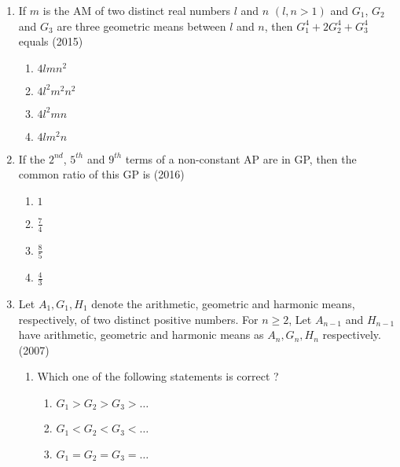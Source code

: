 \begin{enumerate}[label=\thesubsection.\arabic*,ref=\thesubsection.\theenumi]
	{\hfill{}} 
\begin{enumerate}
\end{enumerate}
    \item If $m$ is the AM of two distinct real numbers $l$ and $n$ $(l, n>1)$ and $G_1$,  $G_2$ and $G_3$ are three geometric means between $l$ and $n$,  then $G_1^4+2G_2^4+G_3^4$ equals 
%    
    \hfill(2015)
    \begin{multicols}{4}
\begin{enumerate}    
    \item$4lmn^2$
    \item$4l^2m^2n^2$
    \item$4l^2mn$
    \item$4lm^2n$ 
    \end{enumerate}
\end{multicols}
%
    \item If the $2^{nd}$,  $5^{th}$ and $9^{th}$ terms of a non-constant AP are in GP,  then the common ratio of this GP is
    \hfill(2016)
    \begin{multicols}{4}
\begin{enumerate}    
    \item $1$
    \item $\frac{7}{4}$
    \item $\frac{8}{5}$
    \item $\frac{4}{3}$
    \end{enumerate}
\end{multicols}
%    
\item[]  
%
Let $A_{1},  G_{1},  H_{1} $ denote the arithmetic,  geometric and harmonic means,  respectively,  of two distinct positive numbers. For $n\geq 2$,  Let $A_{n-1}$ and $H_{n-1}$ have arithmetic,  geometric and harmonic means as $A_{n}, G_{n}, H_{n}$ respectively. \hfill(2007)
\begin{enumerate}    
%      
%  
 \item Which one of the following statements is correct ?
\begin{enumerate}    
%
% 
	\item$G_{1}>G_{2}>G_{3}>\dots$ 
%
 \item$G_{1}<G_{2}<G_{3}<\dots$
%
\item$G_{1}=G_{2}=G_{3}=\dots$

\end{enumerate}
\end{enumerate}
\end{enumerate}
